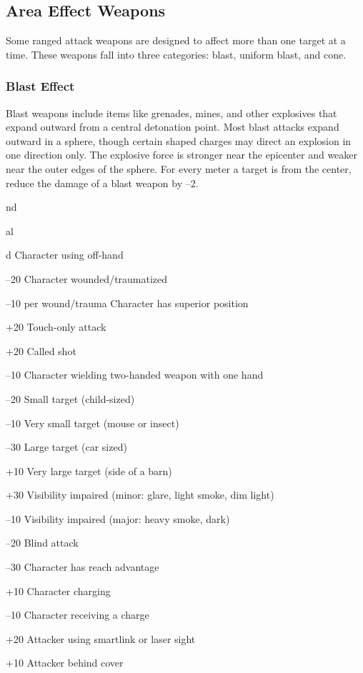 \subsection{Area Effect Weapons}

Some ranged attack weapons are designed to affect 
more than one target at a time. These weapons fall 
into three categories: blast, uniform blast, and cone.

\subsubsection{Blast Effect}

Blast weapons include items like grenades, mines, and 
other explosives that expand outward from a central 
detonation point. Most blast attacks expand outward 
in a sphere, though certain shaped charges may direct 
an explosion in one direction only. The explosive force 
is stronger near the epicenter and weaker near the 
outer edges of the sphere. For every meter a target is 
from the center, reduce the damage of a blast weapon 
by –2.

nd 

al 

d 
Character using off-hand

–20
Character wounded/traumatized

–10 per wound/trauma
Character has superior position

+20
Touch-only attack

+20
Called shot

–10
Character wielding two-handed weapon with one hand

–20
Small target (child-sized)

–10
Very small target (mouse or insect)

–30
Large target (car sized)

+10
Very large target (side of a barn)

+30
Visibility impaired (minor: glare, light smoke, dim light)

–10
Visibility impaired (major: heavy smoke, dark)

–20
Blind attack

–30
Character has reach advantage

+10
Character charging

–10
Character receiving a charge

+20
Attacker using smartlink or laser sight

+10
Attacker behind cover

